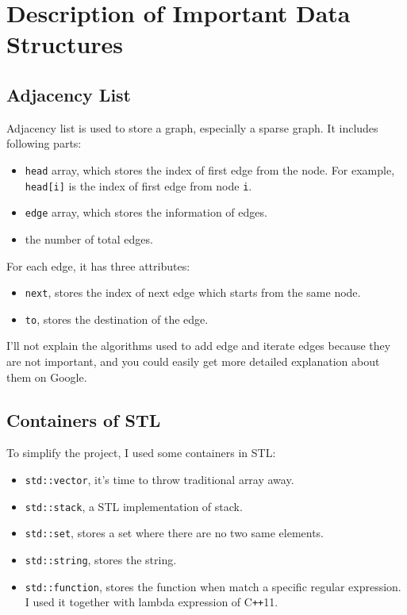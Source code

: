\documentclass{article}
\begin{document}
\section{Description of Important Data Structures}

\subsection{Adjacency List}

Adjacency list is used to store a graph, especially a sparse graph. It includes following parts:
\begin{itemize}
    \item \texttt{head} array, which stores the index of first edge from the node. For example, \texttt{head[i]} is the index of first edge from node \texttt{i}.
    \item \texttt{edge} array, which stores the information of edges.
    \item the number of total edges.
\end{itemize}

For each edge, it has three attributes:
\begin{itemize}
    \item \texttt{next}, stores the index of next edge which starts from the same node.
    \item \texttt{to}, stores the destination of the edge.
\end{itemize}

I'll not explain the algorithms used to add edge and iterate edges because they are not important, and you could easily get more detailed explanation about them on Google.

\subsection{Containers of STL}

To simplify the project, I used some containers in STL:
\begin{itemize}
    \item \texttt{std::vector}, it's time to throw traditional array away.
    \item \texttt{std::stack}, a STL implementation of stack.
    \item \texttt{std::set}, stores a set where there are no two same elements.
    \item \texttt{std::string}, stores the string.
    \item \texttt{std::function}, stores the function when match a specific regular expression. I used it together with lambda expression of C\texttt{++}11.
\end{itemize}
\end{document}

